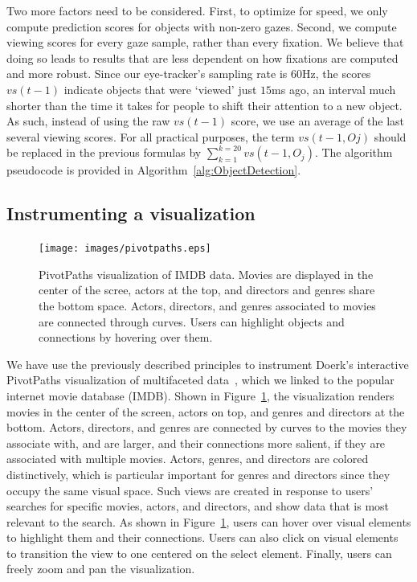 Two more factors need to be considered. First, to optimize for speed, we only compute prediction scores for objects with non-zero gazes. Second, we compute viewing scores for every gaze sample, rather than every fixation. We believe that doing so leads to results that are less dependent on how fixations are computed and more robust. Since our eye-tracker's sampling rate is $60$Hz, the scores $vs(t-1)$ indicate objects that were `viewed' just $15$ms ago, an interval much shorter than the time it takes for people to shift their attention to a new object. As such, instead of using the raw $vs(t-1)$ score, we use an average of the last several viewing scores. For all practical purposes, the term $vs(t-1,Oj)$ should be replaced in the previous formulas by $ \sum_{k=1}^{k=20}{vs(t-1, O_j)}$. The algorithm pseudocode is provided in Algorithm~\ref{alg:ObjectDetection}.



\subsection{Instrumenting a visualization}

\begin{figure}[htb]
  \centering
  \texttt{[image: images/pivotpaths.eps]}
  \caption{PivotPaths visualization of IMDB data. Movies are displayed in the center of the scree, actors at the top, and directors and genres share the bottom space. Actors, directors, and genres associated to movies are connected through curves. Users can highlight objects and connections by hovering over them.}
	\label{fig:pivotpaths}
\end{figure}
We have use the previously described principles to instrument Doerk's interactive PivotPaths visualization of multifaceted data~\cite{dork2012pivotpaths}, which we linked to the popular internet movie database (IMDB). Shown in Figure~\ref{fig:pivotpaths}, the visualization renders movies in the center of the screen, actors on top, and genres and directors at the bottom. Actors, directors, and genres are connected by curves to the movies they associate with, and are larger, and their connections more salient, if they are associated with multiple movies. Actors, genres, and directors are colored distinctively, which is particular important for genres and directors since they occupy the same visual space. Such views are created in response to users' searches for specific movies, actors, and directors, and show data that is most relevant to the search. As shown in Figure~\ref{fig:pivotpaths}, users can hover over visual elements to highlight them and their connections. Users can also click on visual elements to transition the view to one centered on the select element. Finally, users can freely zoom and pan the visualization. 

